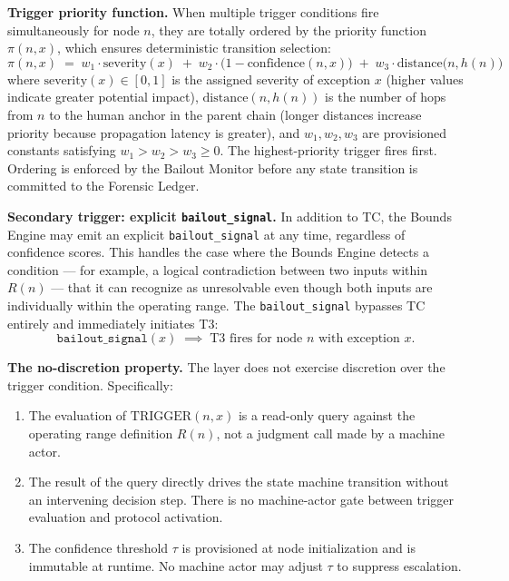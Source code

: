 \bigskip
\noindent\textbf{Trigger priority function.} When multiple trigger conditions fire simultaneously for node $n$, they are totally ordered by the priority function $\pi(n, x)$, which ensures deterministic transition selection:
\begin{equation}
\pi(n, x) \;=\; w_1 \cdot \text{severity}(x) \;+\; w_2 \cdot \bigl(1 - \text{confidence}(n, x)\bigr) \;+\; w_3 \cdot \text{distance}\bigl(n, h(n)\bigr) \tag{PF}
\end{equation}
where $\text{severity}(x) \in [0, 1]$ is the assigned severity of exception $x$ (higher values indicate greater potential impact), $\text{distance}(n, h(n))$ is the number of hops from $n$ to the human anchor in the parent chain (longer distances increase priority because propagation latency is greater), and $w_1, w_2, w_3$ are provisioned constants satisfying $w_1 > w_2 > w_3 \geq 0$. The highest-priority trigger fires first. Ordering is enforced by the Bailout Monitor before any state transition is committed to the Forensic Ledger.

\bigskip
\noindent\textbf{Secondary trigger: explicit \texttt{bailout\_signal}.} In addition to TC, the Bounds Engine may emit an explicit \texttt{bailout\_signal} at any time, regardless of confidence scores. This handles the case where the Bounds Engine detects a condition --- for example, a logical contradiction between two inputs within $R(n)$ --- that it can recognize as unresolvable even though both inputs are individually within the operating range. The \texttt{bailout\_signal} bypasses TC entirely and immediately initiates T3:
\begin{equation}
\texttt{bailout\_signal}(x) \;\implies\; \text{T3 fires for node } n \text{ with exception } x. \tag{TC-secondary}
\end{equation}

\bigskip
\noindent\textbf{The no-discretion property.} The \bounds{} layer does not exercise discretion over the trigger condition. Specifically:

\begin{enumerate}
    \item The evaluation of $\text{TRIGGER}(n, x)$ is a read-only query against the operating range definition $R(n)$, not a judgment call made by a machine actor.
    \item The result of the query directly drives the state machine transition without an intervening decision step. There is no machine-actor gate between trigger evaluation and protocol activation.
    \item The confidence threshold $\tau$ is provisioned at node initialization and is immutable at runtime. No machine actor may adjust $\tau$ to suppress escalation.
\end{enumerate}

